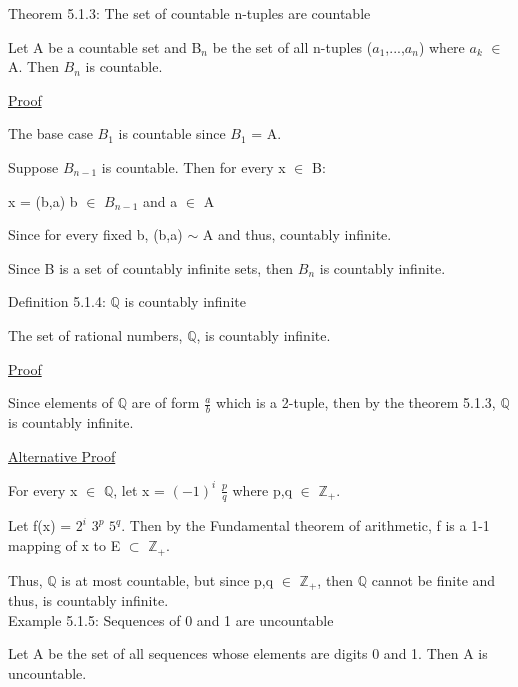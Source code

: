 { \color{red} Theorem 5.1.3: The set of countable n-tuples are countable } 

	\begin{adjustbox}{minipage=14cm, right}
		Let A be a countable set and B$_n$ be the set of all n-tuples ($a_1$,...,$a_n$)
		where $a_k$ $\in$ A. Then $B_n$ is countable.
	\end{adjustbox}

{ \color{magenta} \underline{Proof} } 
	
	The base case $B_1$ is countable since $B_1$ = A.

	Suppose $B_{n-1}$ is countable. Then for every x $\in$ B:

	\qquad x = (b,a) \qquad \qquad b $\in$ $B_{n-1}$ and a $\in$ A

	Since for every fixed b, (b,a) $\sim$ A and thus, countably infinite.

	Since B is a set of countably infinite sets, then $B_{n}$
	is countably infinite. \\

\newpage

{ \color{blue} Definition 5.1.4: $\mathbb{Q}$ is countably infinite } 

	\begin{adjustbox}{minipage=14cm, right}
		The set of rational numbers, $\mathbb{Q}$, is countably infinite.
	\end{adjustbox}

{ \color{magenta} \underline{Proof} } 
	
	Since elements of $\mathbb{Q}$ are of form $\frac{a}{b}$ which is a
	2-tuple, then by the {\color{red} theorem 5.1.3}, $\mathbb{Q}$ is countably infinite.

{ \color{magenta} \underline{Alternative Proof} } 
	
	For every x $\in$ $\mathbb{Q}$, let x = $(-1)^i$ $\frac{p}{q}$ where p,q $\in$ $\mathbb{Z}_+$.

	Let f(x) = $2^i$ $3^p$ $5^q$. Then by the Fundamental theorem of arithmetic,
	f is a 1-1 mapping of x to E $\subset$ $\mathbb{Z}_+$.

	Thus, $\mathbb{Q}$ is at most countable, but since p,q $\in$ $\mathbb{Z}_+$,
	then $\mathbb{Q}$ cannot be finite and thus, is countably infinite. \\

{ \color{purple} Example 5.1.5: Sequences of 0 and 1 are uncountable } 

	\begin{adjustbox}{minipage=14cm, right}
		Let A be the set of all sequences whose elements are digits 0 and 1.
		Then A is uncountable.
	\end{adjustbox}

